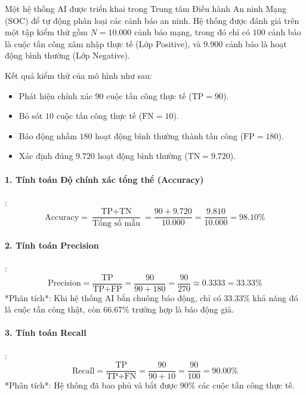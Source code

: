 \begin{example}
Một hệ thống AI được triển khai trong Trung tâm Điều hành An ninh Mạng (SOC) để tự động phân loại các cảnh báo an ninh. Hệ thống được đánh giá trên một tập kiểm thử gồm $N = 10.000$ cảnh báo mạng, trong đó chỉ có $100$ cảnh báo là cuộc tấn công xâm nhập thực tế (Lớp Positive), và $9.900$ cảnh báo là hoạt động bình thường (Lớp Negative).

Kết quả kiểm thử của mô hình như sau:
\begin{itemize}
  \item Phát hiện chính xác $90$ cuộc tấn công thực tế ($\text{TP} = 90$).
  \item Bỏ sót $10$ cuộc tấn công thực tế ($\text{FN} = 10$).
  \item Báo động nhầm $180$ hoạt động bình thường thành tấn công ($\text{FP} = 180$).
  \item Xác định đúng $9.720$ hoạt động bình thường ($\text{TN} = 9.720$).
\end{itemize}

\paragraph{1. Tính toán Độ chính xác tổng thể (Accuracy)}:
\begin{equation*}
\text{Accuracy} = \frac{\text{TP} + \text{TN}}{\text{Tổng số mẫu}} = \frac{90 + 9.720}{10.000} = \frac{9.810}{10.000} = 98.10\%
\end{equation*}

\paragraph{2. Tính toán Precision}:
\begin{equation*}
\text{Precision} = \frac{\text{TP}}{\text{TP} + \text{FP}} = \frac{90}{90 + 180} = \frac{90}{270} \approx 0.3333 = 33.33\%
\end{equation*}
*Phân tích*: Khi hệ thống AI bắn chuông báo động, chỉ có $33.33\%$ khả năng đó là cuộc tấn công thật, còn $66.67\%$ trường hợp là báo động giả.

\paragraph{3. Tính toán Recall}:
\begin{equation*}
\text{Recall} = \frac{\text{TP}}{\text{TP} + \text{FN}} = \frac{90}{90 + 10} = \frac{90}{100} = 90.00\%
\end{equation*}
*Phân tích*: Hệ thống đã bao phủ và bắt được $90\%$ các cuộc tấn công thực tế.


\end{example}

